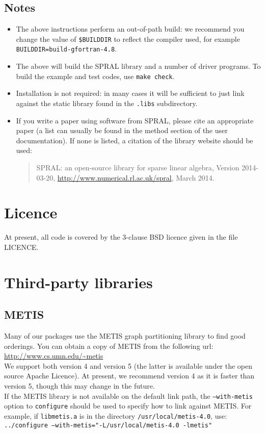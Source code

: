 \documentclass{spral}
\begin{document}
\subsection*{Notes}
\begin{itemize}
   \item The above instructions perform an out-of-path build: we recommend you
      change the value of \texttt{\$BUILDDIR} to reflect the compiler used, for
      example \texttt{BUILDDIR=build-gfortran-4.8}.
   \item The above will build the SPRAL library and a number of driver programs.
      To build the example and test codes, use \texttt{make check}.
   \item Installation is not required: in many cases it will be sufficient to
      just link against the static library found in the \texttt{.libs}
      subdirectory.
   \item If you write a paper using software from SPRAL, please cite an
      appropriate paper (a list can usually be found in the method section of
      the user documentation). If none is listed, a citation of the library
      website should be used:
      \begin{quote}
         SPRAL: an open-source library for sparse linear algebra, Version 2014-03-20, \url{http://www.numerical.rl.ac.uk/spral}, March 2014.
      \end{quote}
\end{itemize}

\section{Licence}
At present, all code is covered by the 3-clause BSD licence given in the file
LICENCE.

\section{Third-party libraries}
\subsection{METIS}
Many of our packages use the METIS graph partitioning library to find good
orderings. You can obtain a copy of METIS from the following url:\\
\url{http://www.cs.umn.edu/~metis}\\
We support both version 4 and version 5 (the latter is available under the open
source Apache Licence). At present, we recommend version 4 as it is faster than
version 5, though this may change in the future.\\
If the METIS library is not available on the default link path, the
\texttt{--with-metis} option to \texttt{configure} should be used to specify
how to link against METIS. For example, if \texttt{libmetis.a} is in the directory \texttt{/usr/local/metis-4.0}, use: \\
\texttt{../configure --with-metis="-L/usr/local/metis-4.0 -lmetis"}
\end{document}
